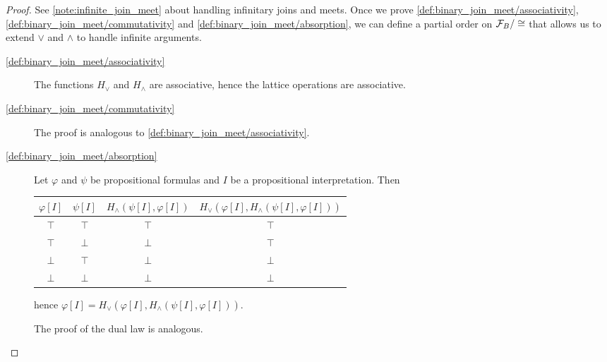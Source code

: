 \begin{proof}
  See \cref{note:infinite_join_meet} about handling infinitary joins and meets. Once we prove \ref{def:binary_join_meet/associativity}, \ref{def:binary_join_meet/commutativity} and \ref{def:binary_join_meet/absorption}, we can define a partial order on $\mathcal F_B / \cong$ that allows us to extend $\lor$ and $\land$ to handle infinite arguments.

  \begin{description}
    \item[\ref{def:binary_join_meet/associativity}] The functions $H_\lor$ and $H_\land$ are associative, hence the lattice operations are associative.
    \item[\ref{def:binary_join_meet/commutativity}] The proof is analogous to \ref{def:binary_join_meet/associativity}.
    \item[\ref{def:binary_join_meet/absorption}] Let $\varphi$ and $\psi$ be propositional formulas and $I$ be a propositional interpretation. Then
    \begin{center}
      \begin{tabular}{c c | c | c}
        $\varphi[I]$ & $\psi[I]$ & $H_\land(\psi[I], \varphi[I])$ & $H_\lor(\varphi[I], H_\land(\psi[I], \varphi[I]))$ \\
        \hline
        $\top$       & $\top$    & $\top$                         & $\top$ \\
        $\top$       & $\bot$    & $\bot$                         & $\top$ \\
        $\bot$       & $\top$    & $\bot$                         & $\bot$ \\
        $\bot$       & $\bot$    & $\bot$                         & $\bot$
      \end{tabular}
    \end{center}
    hence $\varphi[I] = H_\lor(\varphi[I], H_\land(\psi[I], \varphi[I]))$.

    The proof of the dual law is analogous.


\end{description}
\end{proof}
